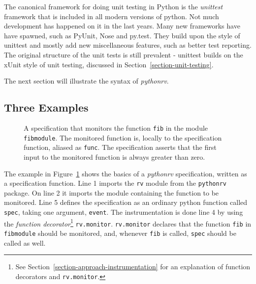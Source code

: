 \documentclass[a4paper,11pt]{kth-mag}
\begin{document}
The canonical framework for doing unit testing in Python is the
\textit{unittest} framework that is included in all modern versions of python.
Not much development has happened on it in the last years. Many new frameworks
have have spawned, such as PyUnit, Nose and py.test. They build upon the style
of unittest and mostly add new miscellaneous features, such as better test
reporting. The original structure of the unit tests is still prevalent -
unittest builds on the xUnit style of unit testing, discussed in
Section~\ref{section-unit-testing}.

The next section will illustrate the syntax of \textit{pythonrv}.


\subsection{Three Examples}
\lstset{language=Python,numbers=left}

\begin{figure}[h!]
	\begin{center}
	\begin{minipage}{0.7\textwidth}
	
	\end{minipage}
	\end{center}

	\caption{A specification that monitors the function \texttt{fib} in the
	module \texttt{fibmodule}. The monitored function is, locally to the
specification function, aliased as \texttt{func}. The specification asserts
that the first input to the monitored function is always greater than zero.}
	\label{figure-syntax-example-1}
\end{figure}

The example in Figure~\ref{figure-syntax-example-1} shows the basics of a
\textit{pythonrv} specification, written as a specification function. Line 1
imports the \texttt{rv} module from the \texttt{pythonrv} package. On line 2 it
imports the module containing the function to be monitored. Line 5 defines
the specification as an ordinary python function called \texttt{spec}, taking
one argument, \texttt{event}. The instrumentation is done line 4 by using the
\textit{function decorator}\footnote{See
Section~\ref{section-approach-instrumentation} for an explanation of function
decorators and \texttt{rv.monitor}.} \texttt{rv.monitor}. \texttt{rv.monitor}
declares that the function \texttt{fib} in \texttt{fibmodule} should be
monitored, and, whenever \texttt{fib} is called, \texttt{spec} should be called
as well.
\end{document}
